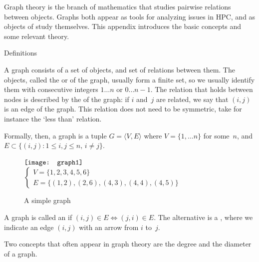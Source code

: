 
Graph theory is the branch of mathematics that studies pairwise
relations between objects. Graphs both appear as tools for analyzing
issues in \ac{HPC}, and as objects of study themselves. This
appendix introduces the basic concepts and some relevant theory.

 {Definitions}

A graph consists of a set of objects, and set of relations between them.
The objects, called the 
or  of the graph, usually form a finite set, so we
usually identify them with consecutive integers $1\ldots n$ or $0\ldots
n-1$. The relation that holds between nodes is described by the
 of the graph: if $i$ and~$j$ are related, we say
that $( i,j)$ is an edge of the graph. This relation does not need to
be symmetric, take for instance the `less than' relation.

Formally, then, a graph is a tuple $G=\langle V,E\rangle$ where
$V=\{1,\ldots n\}$ for some~$n$, and $E\subset\{(i,j)\colon 1\leq
i,j\leq n,\,i\not=j\}$.

\begin{figure}[ht]
  \hbox{$\vcenter{\hbox{%
        \texttt{[image: graph1]}
    }}$%
    $
    \begin{cases}
      V=\{1,2,3,4,5,6\}\\
      E=\{ (1,2),(2,6),(4,3),(4,4),(4,5)\}
    \end{cases}
    $}
  \caption{A simple graph}
  \label{fig:graph1}  
\end{figure}

A graph is called an  if $(i,j)\in
E\Leftrightarrow (j,i)\in E$. The alternative is a
, where we indicate an edge $(i,j)$ with
an arrow from $i$ to~$j$.

Two concepts that often appear in graph theory are the
degree and the diameter of a graph. 


